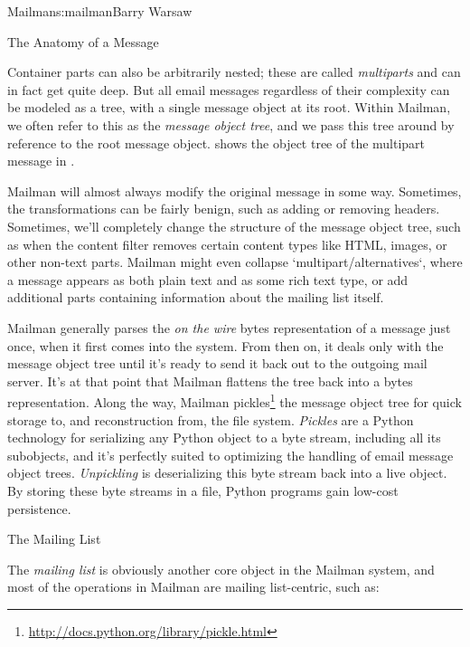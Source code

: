 \begin{aosachapter}{Mailman}{s:mailman}{Barry Warsaw}
\begin{aosasect1}{The Anatomy of a Message}

Container parts can also be arbitrarily nested; these are called
\emph{multiparts} and can in fact get quite deep.  But all email
messages regardless of their complexity can be modeled as a tree, with
a single message object at its root.  Within Mailman, we often refer
to this as the \emph{message object tree}, and we pass this tree
around by reference to the root message object.
 shows the object tree of the
multipart message in .


Mailman will almost always modify the original message in some way.
Sometimes, the transformations can be fairly benign, such as adding or
removing headers.  Sometimes, we'll completely change the structure of
the message object tree, such as when the content filter removes
certain content types like HTML, images, or other non-text parts.
Mailman might even collapse `multipart/alternatives`, where a message
appears as both plain text and as some rich text type, or add
additional parts containing information about the mailing list itself.

Mailman generally parses the \emph{on the wire} bytes representation
of a message just once, when it first comes into the system.  From
then on, it deals only with the message object tree until it's ready
to send it back out to the outgoing mail server.  It's at that point
that Mailman flattens the tree back into a bytes representation.
Along the way, Mailman
pickles\footnote{\url{http://docs.python.org/library/pickle.html}} the
message object tree for quick storage to, and reconstruction from, the
file system.  \emph{Pickles} are a Python technology for serializing
any Python object to a byte stream, including all its subobjects, and
it's perfectly suited to optimizing the handling of email message
object trees. \emph{Unpickling} is deserializing this byte stream back
into a live object.  By storing these byte streams in a file, Python
programs gain low-cost persistence.

\end{aosasect1}

\begin{aosasect1}{The Mailing List}

The \emph{mailing list} is obviously another core object in the
Mailman system, and most of the operations in Mailman are mailing
list-centric, such as:


\end{aosasect1}
\end{aosachapter}
